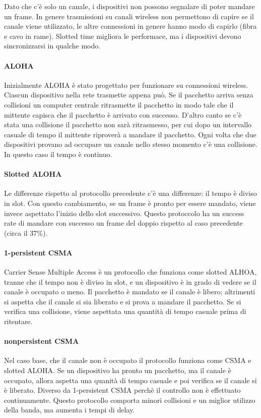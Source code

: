 \documentclass{article}
\begin{document}
Dato che c'è solo un canale, i dispositivi non possono segnalare di poter
mandare un frame. In genere trasmissioni su canali wireless non permettono di
capire se il canale viene utilizzato, le altre connessioni in genere hanno modo
di capirlo (fibra e cavo in rame).
Slotted time migliora le performace, ma i dispositivi devono sincronizzarsi in
qualche modo.

\paragraph{ALOHA}
Inizialmente ALOHA è stato progettato per funzionare su connessioni wireless.
Ciascun dispositivo nella rete trasmette appena può. Se il pacchetto arriva
senza collisioni un computer centrale ritrasmette il pacchetto in modo tale che
il mittente capisca che il pacchetto è arrivato con successo. D'altro canto se
c'è stata una collisione il pacchetto non sarà ritrasmesso, per cui dopo un
intervallo casuale di tempo il mittente riproverà a mandare il pacchetto. Ogni
volta che due dispositivi provano ad occupare un canale nello stesso momento c'è
una collisione. In questo caso il tempo è continuo.

\paragraph{Slotted ALOHA}
Le differenze rispetto al protocollo precedente c'è una differenze: il tempo è
diviso in slot. Con questo cambiamento, se un frame è pronto per essere
mandato, viene invece aspettato l'inizio dello slot successivo. Questo
protoccolo ha un success rate di mandare con successo un frame del doppio
rispetto al caso precedente (circa il 37\%).

\paragraph{1-persistent CSMA}
Carrier Sense Multiple Access è un protocollo che funziona come slotted ALHOA,
tranne che il tempo non è diviso in slot, e un dispositivo è in grado di vedere
se il canale è occupato o meno. Il pacchetto è mandato se il canale è libero;
altrimenti si aspetta che il canale si sia liberato e si prova a mandare il
pacchetto. Se si verifica una collisione, viene aspettata una quantità di tempo
casuale prima di ritentare.

\paragraph{nonpersistent CSMA}
Nel caso base, che il canale non è occupato il protocollo funziona come CSMA e
slotted ALOHA. Se un dispositivo ha pronto un pacchetto, ma il canale è
occupato, allora aspetta una quanità di tempo casuale e poi verifica se il
canale si è liberato. Diverso da 1-persistent CSMA perchè il controllo non è
effettuato continuamente. Questo protocollo comporta minori collisioni e un
miglior utilizzo della banda, ma aumenta i tempi di delay.
\end{document}
